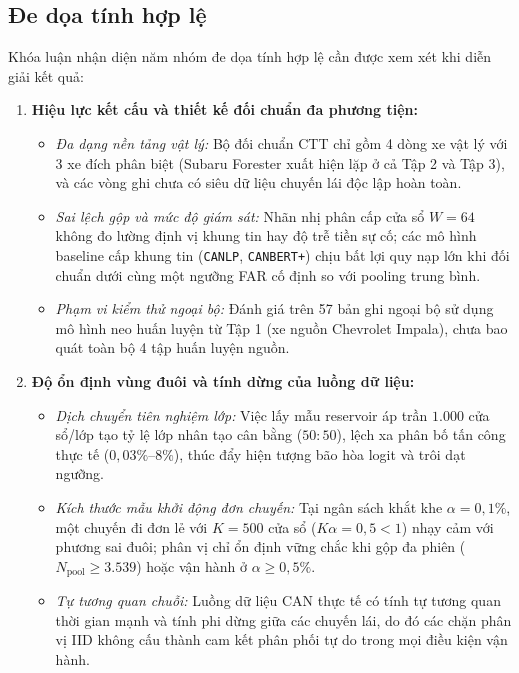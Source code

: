 \documentclass[12pt, a4paper, reqno, oneside]{book}
\DeclareRobustCommand{\code}[1]{\nolinkurl{#1}}
\begin{document}
\subsection{Đe dọa tính hợp lệ}\label{sec:threats-to-validity}
Khóa luận nhận diện năm nhóm đe dọa tính hợp lệ cần được xem xét khi diễn giải kết quả:
\begin{enumerate}
    \item \textbf{Hiệu lực kết cấu và thiết kế đối chuẩn đa phương tiện:}
    \begin{itemize}
        \item \textit{Đa dạng nền tảng vật lý:} Bộ đối chuẩn CTT chỉ gồm 4 dòng xe vật lý với 3 xe đích phân biệt (Subaru Forester xuất hiện lặp ở cả Tập 2 và Tập 3), và các vòng ghi chưa có siêu dữ liệu chuyến lái độc lập hoàn toàn.
        \item \textit{Sai lệch gộp và mức độ giám sát:} Nhãn nhị phân cấp cửa sổ $W=64$ không đo lường định vị khung tin hay độ trễ tiền sự cố; các mô hình baseline cấp khung tin (\code{CANLP}, \code{CANBERT+}) chịu bất lợi quy nạp lớn khi đối chuẩn dưới cùng một ngưỡng FAR cố định so với pooling trung bình.
        \item \textit{Phạm vi kiểm thử ngoại bộ:} Đánh giá trên 57 bản ghi ngoại bộ sử dụng mô hình neo huấn luyện từ Tập 1 (xe nguồn Chevrolet Impala), chưa bao quát toàn bộ 4 tập huấn luyện nguồn.
    \end{itemize}

    \item \textbf{Độ ổn định vùng đuôi và tính dừng của luồng dữ liệu:}
    \begin{itemize}
        \item \textit{Dịch chuyển tiên nghiệm lớp:} Việc lấy mẫu reservoir áp trần $1.000$ cửa sổ/lớp tạo tỷ lệ lớp nhân tạo cân bằng ($50:50$), lệch xa phân bố tấn công thực tế ($0{,}03\%\text{--}8\%$), thúc đẩy hiện tượng bão hòa logit và trôi dạt ngưỡng.
        \item \textit{Kích thước mẫu khởi động đơn chuyến:} Tại ngân sách khắt khe $\alpha=0{,}1\%$, một chuyến đi đơn lẻ với $K=500$ cửa sổ ($K\alpha = 0{,}5 < 1$) nhạy cảm với phương sai đuôi; phân vị chỉ ổn định vững chắc khi gộp đa phiên ($N_{\text{pool}} \ge 3.539$) hoặc vận hành ở $\alpha \ge 0{,}5\%$.
        \item \textit{Tự tương quan chuỗi:} Luồng dữ liệu CAN thực tế có tính tự tương quan thời gian mạnh và tính phi dừng giữa các chuyến lái, do đó các chặn phân vị IID không cấu thành cam kết phân phối tự do trong mọi điều kiện vận hành.
    \end{itemize}


\end{enumerate}
\end{document}
